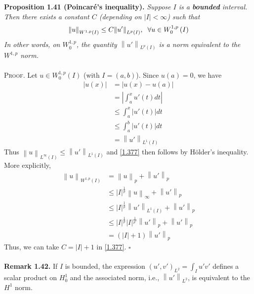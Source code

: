 \documentclass[a4paper,oneside]{article}
\numberwithin{equation}{section}
\begin{document}
\textbf{Proposition 1.41 (Poincar\'{e}'s inequality).} \textit{Suppose $I$ is a \textbf{bounded} interval. Then there exists a constant $C$ (depending on $\left| I \right| < \infty $) such that}
\begin{align}
\label{1.377}
{\left\| u \right\|_{{W^{1,p}}\left( I \right)}} \le C{\left\| {u'} \right\|_{{L^p}\left( I \right)}},\hspace{0.2cm}\forall u \in W_0^{1,p}\left( I \right) 
\end{align} 
\textit{In other words, on $W_0^{1,p}$, the quantity ${\left\| {u'} \right\|_{{L^p}\left( I \right)}}$ is a norm equivalent to the $W^{1,p}$ norm.}\\
\\
\textsc{Proof.} Let $u \in W_0^{1,p}\left( I \right)$ (with $I=\left(a,b\right)$). Since $u\left(a\right)=0$, we have
\begin{align}
\left| {u\left( x \right)} \right| &= \left| {u\left( x \right) - u\left( a \right)} \right|\\
& = \left| {\int_a^x {u'\left( t \right)dt} } \right|\\
& \le \int_a^x {\left| {u'\left( t \right)} \right|dt} \\
& \le \int_a^b {\left| {u'\left( t \right)} \right|dt} \\
& = {\left\| {u'} \right\|_{{L^1}\left(I\right)}}
\end{align}
Thus ${\left\| u \right\|_{{L^\infty }\left( I \right)}} \le {\left\| {u'} \right\|_{{L^1}\left( I \right)}}$ and \eqref{1.377} then follows by H\"{o}lder's inequality. More explicitly,
\begin{align}
{\left\| u \right\|_{{W^{1,p}}\left( I \right)}} &= {\left\| u \right\|_p} + {\left\| {u'} \right\|_p}\\
& \le {\left| I \right|^{\frac{1}{p}}}{\left\| u \right\|_\infty } + {\left\| {u'} \right\|_p}\\
& \le {\left| I \right|^{\frac{1}{p}}}{\left\| {u'} \right\|_{{L^1}\left( I \right)}} + {\left\| {u'} \right\|_p}\\
& \le {\left| I \right|^{\frac{1}{p}}}{\left| I \right|^{\frac{1}{{p'}}}}{\left\| {u'} \right\|_p} + {\left\| {u'} \right\|_p}\\
& = \left( {\left| I \right| + 1} \right){\left\| {u'} \right\|_p}
\end{align}
Thus, we can take ${C = \left| I \right| + 1}$ in \eqref{1.377}. \hfill $\square$\\
\\
\textbf{Remark 1.42.} If $I$ is bounded, the expression ${\left( {u',v'} \right)_{{L^2}}} = \int_I {u'v'} $ defines a scalar product on $H_0^1$ and the associated norm, i.e., ${\left\| {u'} \right\|_{{L^2}}}$, is equivalent to the $H^1$ norm.
\end{document}
